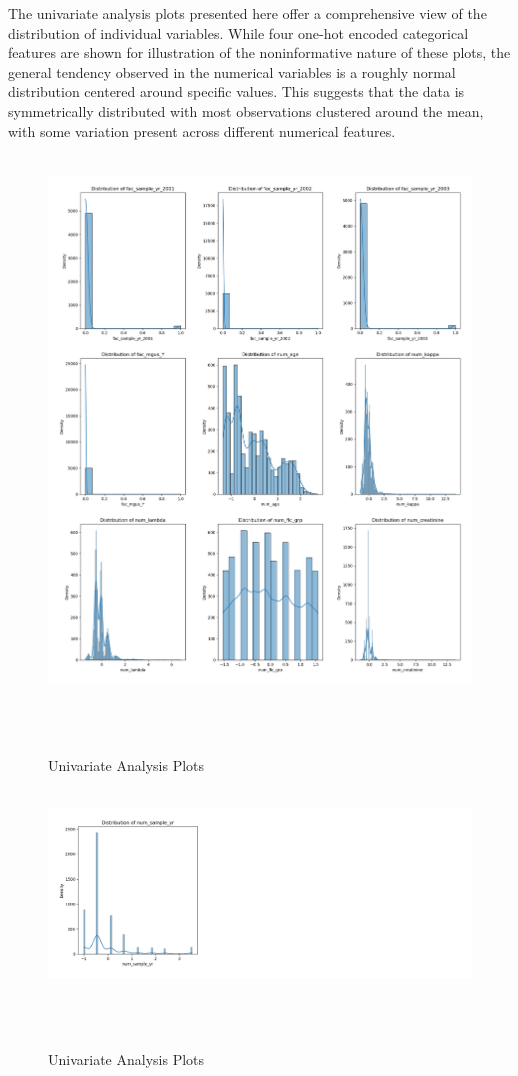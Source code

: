 \noindent The univariate analysis plots presented here offer a comprehensive view of the distribution of individual variables. While four one-hot encoded categorical features are shown for illustration of the noninformative nature of these plots, the general tendency observed in the numerical variables is a roughly normal distribution centered around specific values. This suggests that the data is symmetrically distributed with most observations clustered around the mean, with some variation present across different numerical features.
\begin{figure}[h]
    \centering
    \includegraphics[scale=0.21]{Figures/EDA/uni3.png}
    \caption{Univariate Analysis Plots}
    \label{fig:uni1}
\end{figure}


\begin{figure}[h]
    \centering
    \includegraphics[scale=0.21]{Figures/EDA/uni4.png}
    \caption{Univariate Analysis Plots}
    \label{fig:uni2}
\end{figure}


